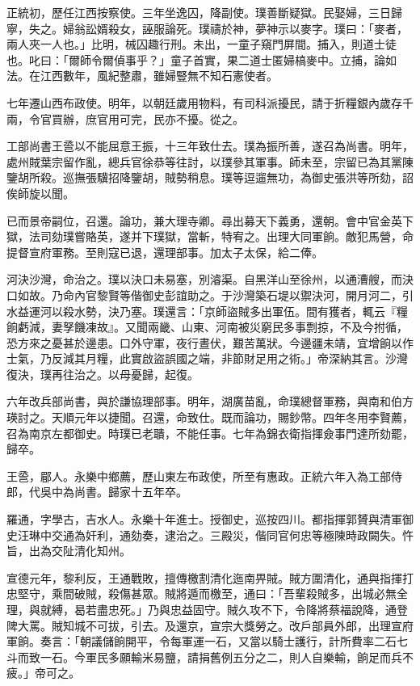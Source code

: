\begin{pinyinscope}
正統初，歷任江西按察使。三年坐逸囚，降副使。璞善斷疑獄。民娶婦，三日歸寧，失之。婦翁訟婿殺女，誣服論死。璞禱於神，夢神示以麥字。璞曰：「麥者，兩人夾一人也。」比明，械囚趣行刑。未出，一童子窺門屏間。捕入，則道士徒也。叱曰：「爾師令爾偵事乎？」童子首實，果二道士匿婦槁麥中。立捕，論如法。在江西數年，風紀整肅，雖婦豎無不知石憲使者。

七年遷山西布政使。明年，以朝廷歲用物料，有司科派擾民，請于折糧銀內歲存千兩，令官買辦，庶官用可完，民亦不擾。從之。

工部尚書王巹以不能屈意王振，十三年致仕去。璞為振所善，遂召為尚書。明年，處州賊葉宗留作亂，總兵官徐恭等往討，以璞參其軍事。師未至，宗留已為其黨陳鑒胡所殺。巡撫張驥招降鑒胡，賊勢稍息。璞等逗遛無功，為御史張洪等所劾，詔俟師旋以聞。

已而景帝嗣位，召還。論功，兼大理寺卿。尋出募天下義勇，還朝。會中官金英下獄，法司劾璞嘗賂英，遂并下璞獄，當斬，特宥之。出理大同軍餉。敵犯馬營，命提督宣府軍務。至則寇已退，還理部事。加太子太保，給二俸。

河決沙灣，命治之。璞以決口未易塞，別濬渠。自黑洋山至徐州，以通漕艘，而決口如故。乃命內官黎賢等偕御史彭誼助之。于沙灣築石堤以禦決河，開月河二，引水益運河以殺水勢，決乃塞。璞還言：「京師盜賊多出軍伍。間有獲者，輒云『糧餉虧減，妻孥饑凍故』。又聞兩畿、山東、河南被災窮民多事剽掠，不及今拊循，恐方來之憂甚於邊患。口外守軍，夜行晝伏，艱苦萬狀。今邊疆未靖，宜增餉以作士氣，乃反減其月糧，此實啟盜誤國之端，非節財足用之術。」帝深納其言。沙灣復決，璞再往治之。以母憂歸，起復。

六年改兵部尚書，與於謙協理部事。明年，湖廣苗亂，命璞總督軍務，與南和伯方瑛討之。天順元年以捷聞。召還，命致仕。既而論功，賜鈔幣。四年冬用李賢薦，召為南京左都御史。時璞已老聵，不能任事。七年為錦衣衛指揮僉事門達所劾罷，歸卒。

王巹，郿人。永樂中鄉薦，歷山東左布政使，所至有惠政。正統六年入為工部侍郎，代吳中為尚書。歸家十五年卒。

羅通，字學古，吉水人。永樂十年進士。授御史，巡按四川。都指揮郭贇與清軍御史汪琳中交通為奸利，通劾奏，逮治之。三殿災，偕同官何忠等極陳時政闕失。忤旨，出為交阯清化知州。

宣德元年，黎利反，王通戰敗，擅傳檄割清化迤南畀賊。賊方圍清化，通與指揮打忠堅守，乘間破賊，殺傷甚眾。賊將遁而檄至，通曰：「吾輩殺賊多，出城必無全理，與就縛，曷若盡忠死。」乃與忠益固守。賊久攻不下，令降將蔡福說降，通登陴大罵。賊知城不可拔，引去。及還京，宣宗大獎勞之。改戶部員外郎，出理宣府軍餉。奏言：「朝議儲餉開平，令每軍運一石，又當以騎士護行，計所費率二石七斗而致一石。今軍民多願輸米易鹽，請捐舊例五分之二，則人自樂輸，餉足而兵不疲。」帝可之。


\end{pinyinscope}

